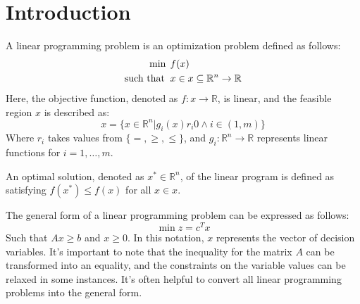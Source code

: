 \section{Introduction}

\begin{definition}
    A linear programming problem is an optimization problem defined as follows:
    \begin{align*}
        \min                      \:&\:f(x)           \\
        \textnormal{such that }     &\: x \in x \subseteq \mathbb{R}^n \rightarrow \mathbb{R} 
    \end{align*}
    Here, the objective function, denoted as $f:x \rightarrow \mathbb{R}$, is linear, and the feasible region $x$ is described as:
    \[x=\{x\in\mathbb{R}^n|g_i(x)r_i0\land i\in(1,m)\}\]
    Where $r_i$ takes values from $\{=,\geq,\leq\}$, and $g_i:\mathbb{R}^n\rightarrow\mathbb{R}$ represents linear functions for $i=1,\dots,m$.
\end{definition}
\begin{definition}
    An optimal solution, denoted as $x^{*} \in \mathbb{R}^n$, of the linear program is defined as satisfying $f(x^{*}) \leq f(x)$ for all $x\in x$.
\end{definition}
The general form of a linear programming problem can be expressed as follows:
\[\min{z}=c^Tx\]
Such that $Ax \geq b$ and $x \geq 0$. 
In this notation, $x$ represents the vector of decision variables.
It's important to note that the inequality for the matrix $A$ can be transformed into an equality, and the constraints on the variable values can be relaxed in some instances.
It's often helpful to convert all linear programming problems into the general form.

